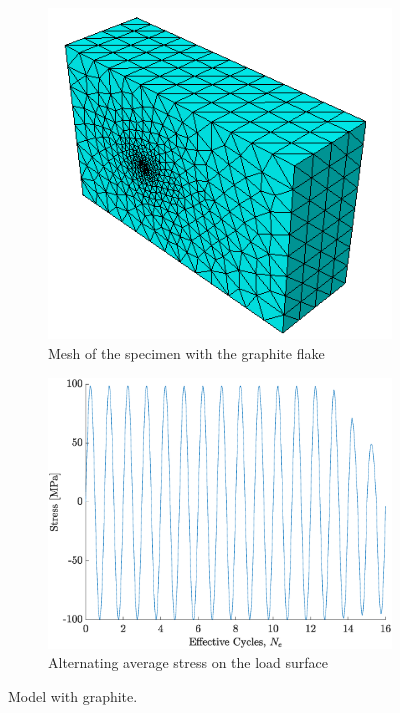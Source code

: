 \documentclass[11pt,a4paper]{article}
\begin{document}
\begin{figure} [ht]
\begin{subfigure}{0.5\textwidth}
\hspace{-8mm}
\includegraphics[scale=0.52, center]{graphite_mesh.png}
\vspace{20mm}
\caption{Mesh of the specimen with the graphite flake}
\label{mesh graphite}
\end{subfigure}
\begin{subfigure}{0.5\textwidth}
\includegraphics[scale=0.35, center]{alternating_graphite.eps}
\caption{Alternating average stress on the load surface}
\label{graphite alternating}
\end{subfigure}
\caption{Model with graphite.}
\end{figure}
\end{document}

